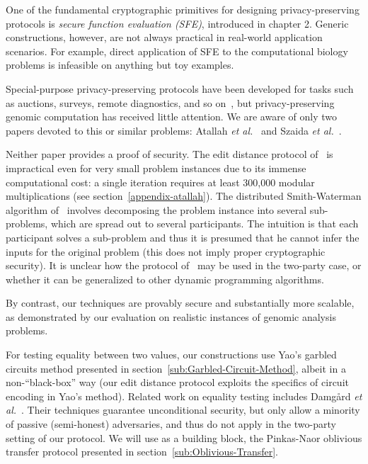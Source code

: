 One of the fundamental cryptographic primitives for designing
privacy-preserving protocols is \emph{secure function evaluation (SFE)},
introduced in chapter 2.  Generic constructions, however, are not always
practical in real-world
application scenarios.  For example, direct application of SFE to the
computational biology problems is infeasible on anything but toy examples.

Special-purpose privacy-preserving protocols have been developed
for tasks such as auctions, surveys, remote diagnostics, and so
on~\cite{FPRS04,FNP04,LP02,NPS99,BPS07}, but privacy-preserving
genomic computation has received little attention.  We are aware of
only two papers devoted to this or similar problems: Atallah \textit{et
al.}~\cite{atallah} and Szaida \textit{et al.}~\cite{Szajda:NDSS:2004}.

Neither paper provides a proof of security.  The edit distance protocol
of~\cite{atallah} is impractical even for very small problem instances due
to its immense computational cost: a single iteration requires at least
300,000 modular multiplications (see section~\ref{appendix-atallah}).
The distributed Smith-Waterman algorithm of~\cite{Szajda:NDSS:2004}
involves decomposing the problem instance into several sub-problems,
which are spread out to several participants.  The intuition is that
each participant solves a sub-problem and thus it is presumed that
he cannot infer the inputs for the original problem (this does not
imply proper cryptographic security).  It is unclear how the protocol
of~\cite{Szajda:NDSS:2004} may be used in the two-party case, or whether
it can be generalized to other dynamic programming algorithms.

By contrast, our techniques are provably secure and substantially more
scalable, as demonstrated by our evaluation on realistic instances of
genomic analysis problems.

For testing equality between two values, our constructions use
Yao's garbled circuits method presented in 
section~\ref{sub:Garbled-Circuit-Method}, albeit in
a non-``black-box'' way (our edit distance protocol exploits the
specifics of circuit encoding in Yao's method).  Related work on
equality testing includes Damg{\aa}rd \textit{et al.}~\cite{Dam-TCC06}.
Their techniques guarantee unconditional security, but only allow a
minority of passive (semi-honest) adversaries, and thus do not apply in
the two-party setting of our protocol.  We will use as a building
block, the Pinkas-Naor oblivious transfer protocol presented
in section~\ref{sub:Oblivious-Transfer}.

